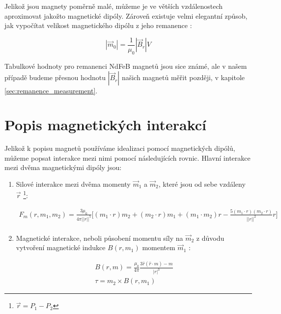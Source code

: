 \documentclass[12pt, a4paper,
 twoside,        %
 openright
]{report}
\begin{document}
Jelikož jsou magnety poměrně malé, můžeme je ve větších vzdálenostech aproximovat jakožto magnetické dipóly.
Zároveň existuje velmi elegantní způsob, jak vypočítat velikost magnetického dipólu z jeho remanence \cite{magnetic_torque}:

\begin{equation}
    \label{eq:mag_mom_remanence}
    |\vec{m}_0| = \frac{1}{\mu_0}|\vec{B}_r|V
\end{equation}

Tabulkové hodnoty pro remanenci NdFeB magnetů jsou sice známé, ale v našem případě budeme přesnou hodnotu $|\vec{B}_r|$ našich magnetů měřit později, v kapitole \ref{sec:remanence_measurement}.

\section{Popis magnetických interakcí}

Jelikož k popisu magnetů používáme idealizaci pomocí magnetických dipólů, můžeme popsat interakce mezi nimi pomocí následujících rovnic.
Hlavní interakce mezi dvěma magnetickými dipóly jsou:
\begin{enumerate}[topsep=0pt, partopsep=0pt]
    \setlength{\itemsep}{0pt}%
    \setlength{\parskip}{0pt}%

    \item Silové interakce \cite{magnetic_force} mezi dvěma momenty $\vec{m}_1$ a $\vec{m}_2$, které jsou od sebe vzdáleny $\vec{r}$ \footnote{$\vec{r} = P_1 - P_2$}:

    \begin{equation}
        \label{eq:F_m}
        \begin{split}
            F_m (r,m_1,m_2) = \frac{3\mu_0}{4\pi ||r||^5} 
            \bigg[
                (m_1\cdot r) m_2 +
                (m_2\cdot r) m_1 +
                (m_1\cdot m_2) r -
                \frac{5(m_1\cdot r)(m_2\cdot r)}{||r||^2} r
            \bigg] \\
        \end{split}
    \end{equation}

    \item Magnetické interakce, neboli působení momentu síly \cite{magnetic_torque} na $\vec{m}_2$ z důvodu vytvoření magnetické indukce $B(r, m_1)$ momentem $\vec{m}_1$ \cite{magnetic_force}:

    \begin{equation}
        \label{eq:B}
        \begin{split}
            B (r, m) = \frac{\mu_0}{4\pi}\frac{3 \hat{r}(\hat{r}\cdot m) - m}{|r|^3} \\
            \tau = m_2 \times B(r, m_1)
        \end{split}
    \end{equation}
\end{enumerate}
\end{document}
